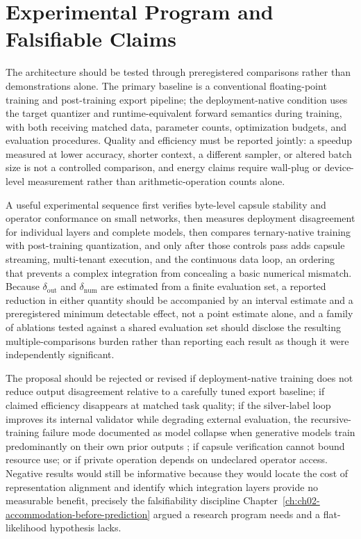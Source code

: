 \section{Experimental Program and Falsifiable Claims}

The architecture should be tested through preregistered comparisons rather than demonstrations alone. The primary baseline is a conventional floating-point training and post-training export pipeline; the deployment-native condition uses the target quantizer and runtime-equivalent forward semantics during training, with both receiving matched data, parameter counts, optimization budgets, and evaluation procedures. Quality and efficiency must be reported jointly: a speedup measured at lower accuracy, shorter context, a different sampler, or altered batch size is not a controlled comparison, and energy claims require wall-plug or device-level measurement rather than arithmetic-operation counts alone.

A useful experimental sequence first verifies byte-level capsule stability and operator conformance on small networks, then measures deployment disagreement for individual layers and complete models, then compares ternary-native training with post-training quantization, and only after those controls pass adds capsule streaming, multi-tenant execution, and the continuous data loop, an ordering that prevents a complex integration from concealing a basic numerical mismatch. Because $\delta_{\mathrm{out}}$ and $\delta_{\mathrm{num}}$ are estimated from a finite evaluation set, a reported reduction in either quantity should be accompanied by an interval estimate and a preregistered minimum detectable effect, not a point estimate alone, and a family of ablations tested against a shared evaluation set should disclose the resulting multiple-comparisons burden rather than reporting each result as though it were independently significant.

The proposal should be rejected or revised if deployment-native training does not reduce output disagreement relative to a carefully tuned export baseline; if claimed efficiency disappears at matched task quality; if the silver-label loop improves its internal validator while degrading external evaluation, the recursive-training failure mode documented as model collapse when generative models train predominantly on their own prior outputs \cite{shumailov2024}; if capsule verification cannot bound resource use; or if private operation depends on undeclared operator access. Negative results would still be informative because they would locate the cost of representation alignment and identify which integration layers provide no measurable benefit, precisely the falsifiability discipline Chapter~\ref{ch:ch02-accommodation-before-prediction} argued a research program needs and a flat-likelihood hypothesis lacks.

